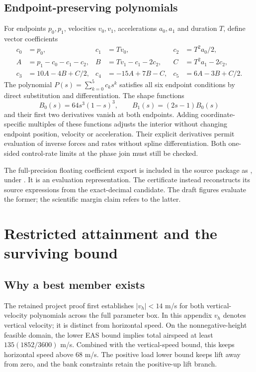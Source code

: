\subsection{Endpoint-preserving polynomials}
For endpoints $p_0,p_1$, velocities $v_0,v_1$, accelerations $a_0,a_1$ and duration $T$, define vector coefficients
\begin{align}
c_0&=p_0,&c_1&=Tv_0,&c_2&=T^2a_0/2,\\
A&=p_1-c_0-c_1-c_2,&B&=Tv_1-c_1-2c_2,&C&=T^2a_1-2c_2,\\
c_3&=10A-4B+C/2,&c_4&=-15A+7B-C,&c_5&=6A-3B+C/2.
\end{align}
The polynomial $P(s)=\sum_{k=0}^5c_ks^k$ satisfies all six endpoint conditions by direct substitution and differentiation. The shape functions
\begin{equation}
B_0(s)=64s^3(1-s)^3,\qquad B_1(s)=(2s-1)B_0(s)
\end{equation}
and their first two derivatives vanish at both endpoints. Adding coordinate-specific multiples of these functions adjusts the interior without changing endpoint position, velocity or acceleration. Their explicit derivatives permit evaluation of inverse forces and rates without spline differentiation. Both one-sided control-rate limits at the phase join must still be checked.

The full-precision floating coefficient export is included in the source package as , under . It is an evaluation representation. The certificate instead reconstructs its source expressions from the exact-decimal candidate. The draft figures evaluate the former; the scientific margin claim refers to the latter.

\section{Restricted attainment and the surviving bound}
\label{app:bounds}
\subsection{Why a best member exists}
The retained project proof first establishes $|v_h|<14$ m/s for both vertical-velocity polynomials across the full parameter box. In this appendix $v_h$ denotes vertical velocity; it is distinct from horizontal speed. On the nonnegative-height feasible domain, the lower EAS bound implies total airspeed at least $135(1852/3600)$ m/s. Combined with the vertical-speed bound, this keeps horizontal speed above 68 m/s. The positive load lower bound keeps lift away from zero, and the bank constraints retain the positive-up lift branch.


